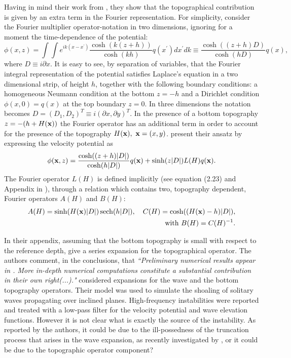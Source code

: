 \documentclass[11pt]{article}
\newcommand{\x}{\ensuremath{\bold{x}}}
\DeclareMathOperator{\sech}{sech}
\begin{document}
Having in mind their work  
from \citet{CraigSulem}, they  show that the topographical contribution is given by an extra term in the
Fourier representation. 
For simplicity, consider the Fourier multiplier operator-notation in two dimensions, ignoring for a
moment the time-dependence of the potential:
\begin{equation}
\phi(x,z) = \int\!\!\! \int e^{ik(x-x^\prime)}\frac{\cosh(k(z+h))}{\cosh(kh)} q(x^\prime) dx^\prime dk\equiv
\frac{\cosh((z+h)D)}{\cosh(h D)} q(x),
\end{equation}  
where $D\equiv i\partial x$.  It is easy to see, by separation of variables,  that the Fourier integral 
representation of the potential  satisfies Laplace's equation in a two dimensional strip, of height  $h$, together
with the following boundary conditions: a 
homogeneous Neumann condition at the bottom $z=-h$ and a Dirichlet condition $\phi(x,0)=q(x)$ at the top
boundary $z=0$. 
In three dimensions the notation becomes $D= (D_1,D_2)^T\equiv i(\partial x,\partial y)^T$. In the presence of a 
bottom topography $z=-(h+H(\x))$ the Fourier operator has an additional term in order to account for  the presence
of the topography $H(\x), ~\x=(x,y)$. \citet{CSNG} present their ansatz  by expressing the velocity potential as
\begin{equation}
\phi(\x,z)=\frac{\cosh((z+h)|D|)}{\cosh(h|D|)} q(\x) + \sinh(z|D|)L(H) q(\x).
\label{CSNG}
\end{equation}
The Fourier operator  $L(H)$ is defined implicitly  (see equation (2.23) and Appendix in \cite{CSNG}),
 through  a relation which contains two, topography dependent, Fourier operators $A(H)$ and $B(H)$:
\begin{eqnarray} 
A(H) =  \sinh(H(\x)|D|)\sech(h|D|), ~ ~ ~C(H)= \cosh((H(\x)-h)|D|),\\
 \mbox{with}~ B(H)=C(H)^{-1} \nonumber.
\end{eqnarray}

In their appendix, assuming that the bottom topography is small with respect to the reference depth,  
\cite{CSNG} give a series expansion for the topographical operator. 
The authors comment, in the conclusions,  that {\it ``Preliminary numerical results appear in
\cite{GuyenneNicholls}. More in-depth numerical computations constitute a substantial contribution in their own right(...)."} 
\citet{GuyenneNicholls} considered  expansions for the wave and the bottom topography operators. 
Their model was used to simulate the shoaling of solitary waves propagating over inclined planes. High-frequency 
instabilities were reported and treated with a low-pass filter for the velocity potential and wave elevation functions.
However it is not clear what is exactly the source of the instability. 
As reported by the authors,  it could be due to the ill-possedness of the truncation process that arises 
in the wave expansion, as recently investigated by \citet{Ambrose}, or  it could be due to the topographic operator
component?
\end{document}
